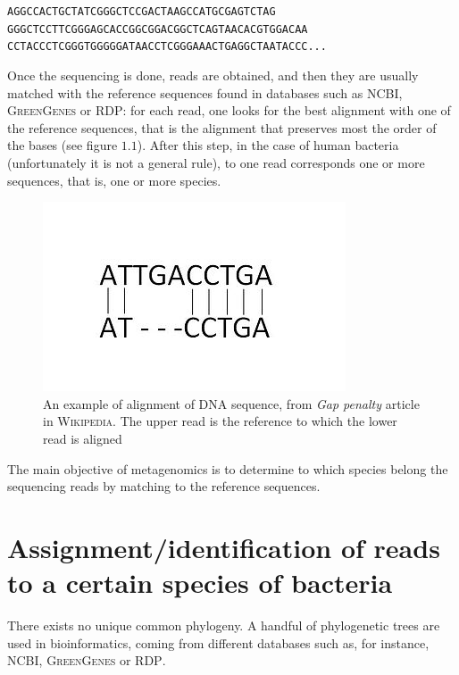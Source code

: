 \documentclass{report}
\begin{document}
\begin{center}
{\tt AGGCCACTGCTATCGGGCTCCGACTAAGCCATGCGAGTCTAG\\
GGGCTCCTTCGGGAGCACCGGCGGACGGCTCAGTAACACGTGGACAA\\
CCTACCCTCGGGTGGGGGATAACCTCGGGAAACTGAGGCTAATACCC...}\\
\end{center}

Once the sequencing is done, reads are obtained, and then they are usually matched with the reference sequences found in databases such as \textsc{NCBI}, \textsc{GreenGenes} or \textsc{RDP}: for each read, one looks for the best alignment with one of the reference sequences, that is the alignment that preserves most the order of the bases (see figure $1.1$). After this step, in the case of human bacteria (unfortunately it is not a general rule), to one read corresponds one or more sequences, that is, one or more species.\\

\begin{figure}[H]
\centering
\includegraphics[scale=0.5]{illustrations/Sequence_gaps.JPG}
\caption{An example of alignment of DNA sequence, from \emph{Gap penalty} article in \textsc{Wikipedia}. The upper read is the reference to which the lower read is aligned}
\end{figure}

The main objective of metagenomics is to determine to which species belong the sequencing reads by matching to the reference sequences.

\section{Assignment/identification of reads to a certain species of bacteria}

There exists no unique common phylogeny. A handful of phylogenetic trees are used in bioinformatics, coming from different databases such as, for instance, \textsc{NCBI}, \textsc{GreenGenes} or \textsc{RDP}.\\
\end{document}
